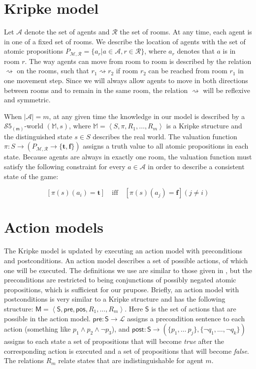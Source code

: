 \documentclass[a4paper]{scrartcl}
\begin{document}
\section*{Kripke model}
Let $\mathcal{A}$ denote the set of agents and $\mathcal{R}$ the set of rooms. At any time, each agent is in one of a fixed set of rooms. We describe the location of agents with the set of atomic propositions $P_{\mathcal{M},\mathcal{R}} = \{a_r | a \in \mathcal{A}, r \in \mathcal{R}\}$, where $a_r$ denotes that $a$ is in room $r$. The way agents can move from room to room is described by the relation $\rightsquigarrow$ on the rooms, such that $r_1 \rightsquigarrow r_2$ if room $r_2$ can be reached from room $r_1$ in one movement step. Since we will always allow agents to move in both directions between rooms and to remain in the same room, the relation $\rightsquigarrow$ will be reflexive and symmetric.

When $|\mathcal{A}| = m$, at any given time the knowledge in our model is described by a $\mathcal{S}5_{\mathsf{(m)}}$-world $(\mathbb{M}, s)$, where $\mathbb{M} = \left<S, \pi, R_1, \dots, R_m \right>$ is a Kripke structure and the distinguished state $s \in S$ describes the real world. The valuation function $\pi: S \rightarrow (P_{\mathcal{M},\mathcal{R}} \rightarrow \{\mathbf{t},\mathbf{f}\})$ assigns a truth value to all atomic propositions in each state. Because agents are always in exactly one room, the valuation function must satisfy the following constraint for every $a \in \mathcal{A}$ in order to describe a consistent state of the game:

$$[\pi(s)(a_i) = \mathbf{t}] \quad \mathrm{iff} \quad [\pi(s)(a_j) = \mathbf{f}] (j \neq i)$$

\section*{Action models}
The Kripke model is updated by executing an action model with preconditions and postconditions. An action model describes a set of possible actions, of which one will be executed. The definitions we use are similar to those given in \cite{postconditions}, but the preconditions are restricted to being conjunctions of possibly negated atomic propositions, which is sufficient for our prupose. Briefly, an action model with postconditions is very similar to a Kripke structure and has the following structure: $\mathsf{M} = \left<\mathsf{S}, \mathsf{pre}, \mathsf{pos}, R_1, \dots, R_m\right>$. Here $\mathsf{S}$ is the set of actions that are possible in the action model.  $\mathsf{pre} : \mathsf{S} \rightarrow \mathcal{L}$ assigns a precondition sentence to each action (something like $p_1 \land p_2 \land \neg p_3$), and $\mathsf{post} : \mathsf{S} \rightarrow (\{p_1, \dots\ p_j \}, \{\neg q_1, \dots, \neg q_k\})$ assigns to each state a set of propositions that will become \emph{true} after the corresponding action is executed and a set of propositions that will become \emph{false}. The relations $R_m$ relate states that are indistinguishable for agent $m$.
\end{document}

